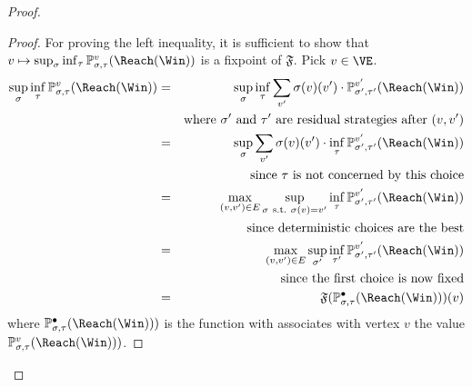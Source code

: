 \begin{proof}
\begin{proof}
    For proving the left inequality, it is sufficient to show that
    $v \mapsto \sup_\sigma \inf_\tau
    \probm_{\sigma,\tau}^v(\Reach(\Win))$ is a fixpoint of
    $\mathfrak{F}$.  Pick $v \in \VE$. 
 \begin{eqnarray*}
      \sup_\sigma \inf_\tau \probm_{\sigma,\tau}^v(\Reach(\Win)) & = &
      \sup_\sigma \inf_\tau \sum_{v'} \sigma(v)(v')  \cdot
      \probm_{\sigma',\tau'}^{v'}(\Reach(\Win)) \\
      & & \text{where}\ \sigma'\ \text{and}\ \tau'\ \text{are residual
        strategies after}\ (v,v') \\
      & = & \sup_\sigma \sum_{v'} \sigma(v)(v')  \cdot \inf_\tau \probm_{\sigma',\tau'}^{v'}(\Reach(\Win)) \\
      & & \text{since}\ \tau\ \text{is not concerned by this choice}
      \\
      & = & \max_{(v,v') \in E} \sup_{\sigma\ \text{s.t.}\
        \sigma(v) = v'} \inf_\tau
      \probm_{\sigma',\tau'}^{v'}(\Reach(\Win)) \\
      & & \text{since deterministic choices are the best} \\
      & = & \max_{(v,v') \in E} \sup_{\sigma'} \inf_{\tau'}
      \probm_{\sigma',\tau'}^{v'}(\Reach(\Win)) \\
      & & \text{since the first choice is now fixed} \\
      & = & \mathfrak{F}(\probm_{\sigma,\tau}^{\bullet}(\Reach(\Win)))(v)
    \end{eqnarray*}
    where $\probm_{\sigma,\tau}^{\bullet}(\Reach(\Win)))$ is the
    function with associates with vertex $v$ the value
    $\probm_{\sigma,\tau}^{v}(\Reach(\Win)))$.

\end{proof}
\end{proof}
